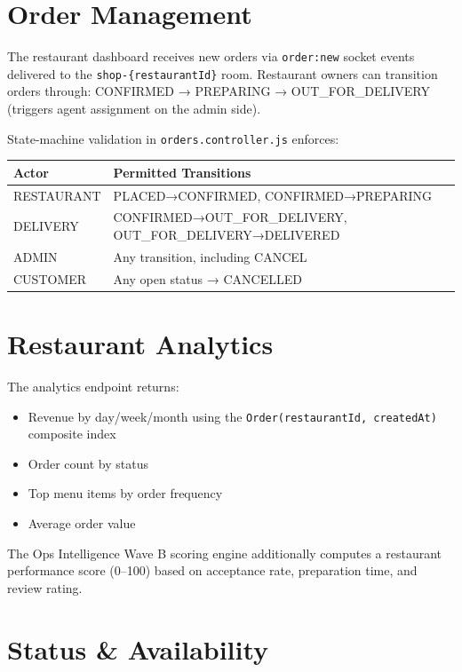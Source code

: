 \documentclass[11pt,a4paper,twoside]{book}
\newcommand{\th}[1]{\textbf{\color{white}#1}}
\begin{document}
\section{Order Management}

The restaurant dashboard receives new orders via \texttt{order:new} socket events
delivered to the \texttt{shop-\{restaurantId\}} room.  Restaurant owners can
transition orders through: CONFIRMED → PREPARING → OUT\_FOR\_DELIVERY (triggers
agent assignment on the admin side).

State-machine validation in \texttt{orders.controller.js} enforces:

\begin{center}\small
\begin{tabular}{ll}
\toprule
\rowcolor{headbg}\th{Actor} & \th{Permitted Transitions} \\
\midrule
RESTAURANT & PLACED→CONFIRMED, CONFIRMED→PREPARING \\
\rowcolor{rowalt}DELIVERY   & CONFIRMED→OUT\_FOR\_DELIVERY, OUT\_FOR\_DELIVERY→DELIVERED \\
ADMIN      & Any transition, including CANCEL \\
\rowcolor{rowalt}CUSTOMER   & Any open status → CANCELLED \\
\bottomrule
\end{tabular}
\end{center}

\section{Restaurant Analytics}

The analytics endpoint returns:
\begin{itemize}[leftmargin=1.4em,nosep]
  \item Revenue by day/week/month using the \texttt{Order(restaurantId, createdAt)} composite index
  \item Order count by status
  \item Top menu items by order frequency
  \item Average order value
\end{itemize}

The Ops Intelligence Wave B scoring engine additionally computes a
restaurant performance score (0–100) based on acceptance rate, preparation
time, and review rating.

\section{Status \& Availability}
\end{document}
